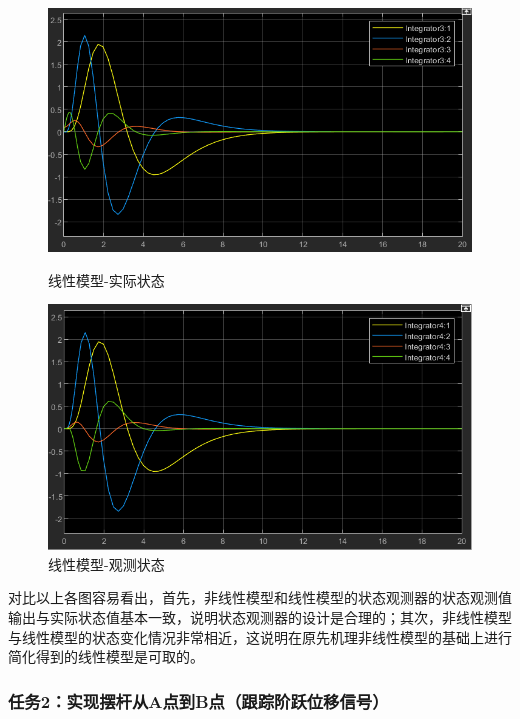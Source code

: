 \documentclass[UTF8]{article}
\begin{document}
\begin{figure}[H]
	\centering
	\begin{minipage}{0.49\linewidth}
		\centering
		\includegraphics[width=0.9\linewidth]{figure/倒立摆-线性模型-状态观测器-实际状态.png}
		\caption{线性模型-实际状态}
	\end{minipage}
	\begin{minipage}{0.49\linewidth}
		\centering
		\includegraphics[width=0.9\linewidth]{figure/倒立摆-线性模型-状态观测器-观测状态.png}
		\caption{线性模型-观测状态}
	\end{minipage}
\end{figure}

对比以上各图容易看出，首先，非线性模型和线性模型的状态观测器的状态观测值输出与实际状态值基本一致，说明状态观测器的设计是合理的；其次，非线性模型与线性模型的状态变化情况非常相近，这说明在原先机理非线性模型的基础上进行简化得到的线性模型是可取的。

\subsubsection{任务2：实现摆杆从A点到B点（跟踪阶跃位移信号）}
\end{document}
